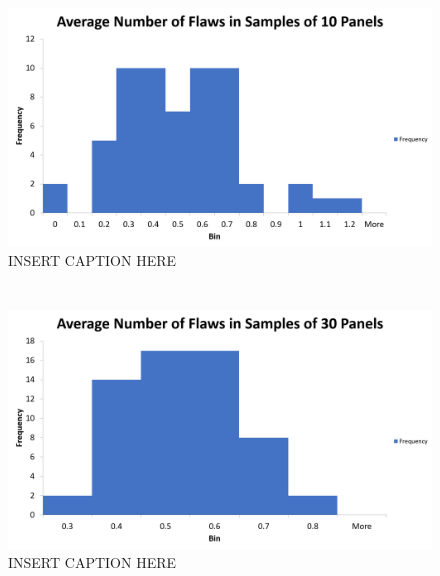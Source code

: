\documentclass[letterpaper]{article}
\begin{document}
\subsection{}%

\subsection{}%

\begin{figure}[H]
 \centering
 \includegraphics[width=\textwidth]{q4.png}
 \caption{INSERT CAPTION HERE}
 \label{4c}
\end{figure}

\subsection{}%

\section{}%

\subsection{}%

\begin{figure}[H]
 \centering
 \includegraphics[width=\textwidth]{q5.png}
 \caption{INSERT CAPTION HERE}
 \label{5a}
\end{figure}

\subsection{}%
\end{document}
